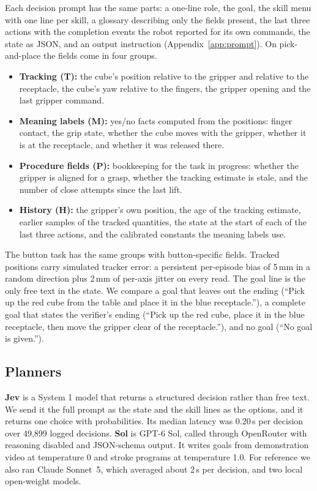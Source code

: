\documentclass[11pt]{article}
\begin{document}
Each decision prompt has the same parts: a one-line role, the goal, the skill menu with one line per skill, a glossary describing only the fields present, the last three actions with the completion events the robot reported for its own commands, the state as JSON, and an output instruction (Appendix~\ref{app:prompt}). On pick-and-place the fields come in four groups.
\begin{itemize}
\item \textbf{Tracking (T):} the cube's position relative to the gripper and relative to the receptacle, the cube's yaw relative to the fingers, the gripper opening and the last gripper command.
\item \textbf{Meaning labels (M):} yes/no facts computed from the positions: finger contact, the grip state, whether the cube moves with the gripper, whether it is at the receptacle, and whether it was released there.
\item \textbf{Procedure fields (P):} bookkeeping for the task in progress: whether the gripper is aligned for a grasp, whether the tracking estimate is stale, and the number of close attempts since the last lift.
\item \textbf{History (H):} the gripper's own position, the age of the tracking estimate, earlier samples of the tracked quantities, the state at the start of each of the last three actions, and the calibrated constants the meaning labels use.
\end{itemize}
The button task has the same groups with button-specific fields. Tracked positions carry simulated tracker error: a persistent per-episode bias of 5\,mm in a random direction plus 2\,mm of per-axis jitter on every read. The goal line is the only free text in the state. We compare a goal that leaves out the ending (``Pick up the red cube from the table and place it in the blue receptacle.''), a complete goal that states the verifier's ending (``Pick up the red cube, place it in the blue receptacle, then move the gripper clear of the receptacle.''), and no goal (``No goal is given.'').

\subsection{Planners}

\textbf{Jev} \citep{jev} is a System 1 model that returns a structured decision rather than free text. We send it the full prompt as the state and the skill lines as the options, and it returns one choice with probabilities. Its median latency was 0.20\,s per decision over 49,899 logged decisions. \textbf{Sol} \citep{sol} is GPT-6 Sol, called through OpenRouter with reasoning disabled and JSON-schema output. It writes goals from demonstration video at temperature 0 and stroke programs at temperature 1.0. For reference we also ran Claude Sonnet~5, which averaged about 2\,s per decision, and two local open-weight models.
\end{document}
